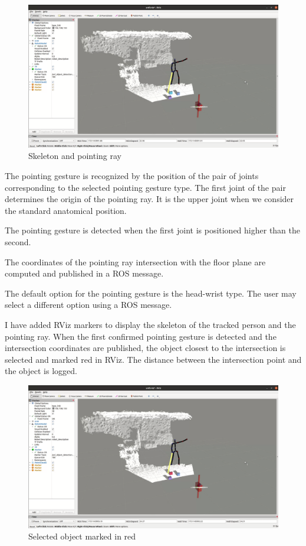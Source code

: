 \begin{figure}[h]
    \centering
    \includegraphics[width=0.5\linewidth]{rViz_3.png}
    \caption{Skeleton and pointing ray}
    \label{fig:enter-label}
\end{figure}

The pointing gesture is recognized by the position of the pair of joints corresponding to the selected pointing gesture type. The first joint of the pair determines the origin of the pointing ray. It is the upper joint when we consider the standard anatomical position.\par
The pointing gesture is detected when the first joint is positioned higher than the second.\par
The coordinates of the pointing ray intersection with the floor plane are computed and published in a ROS message.\par
The default option for the pointing gesture is the head-wrist type. The user may select a different option using a ROS message.\par


I have added RViz markers to display the skeleton of the tracked person and the pointing ray. When the first confirmed pointing gesture is detected and the intersection coordinates are published, the object closest to the intersection is selected and marked red in RViz. The distance between the intersection point and the object is logged.\par

\begin{figure}[h]
    \centering
    \includegraphics[width=0.5\linewidth]{rViz_4.png}
    \caption{Selected object marked in red}
    \label{fig:enter-label}
\end{figure}

